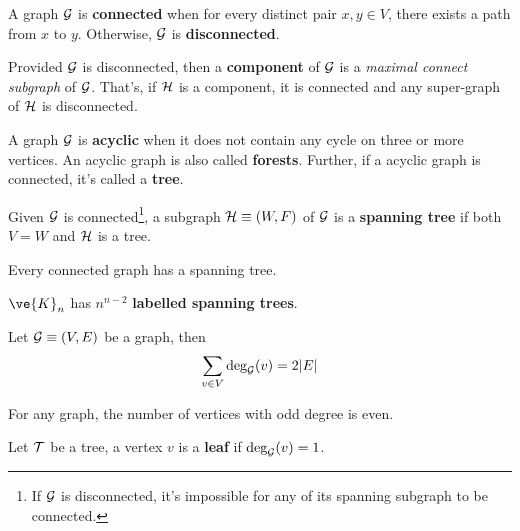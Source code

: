 \documentclass{article}
\begin{document}
		\begin{definition}
			A graph $\mathcal{{G}}$ is \textbf{connected} when for every distinct pair $x, y \in V$, there exists a path from $x$ to $y$. Otherwise, $\mathcal{{G}}$ is \textbf{disconnected}.
		\end{definition}
		
		\begin{definition}
			Provided $\mathcal{{G}}$ is disconnected, then a \textbf{component} of $\mathcal{{G}}$ is a \emph{maximal connect subgraph} of $\mathcal{{G}}$. That's, if $\mathcal{{H}}$ is a component, it is connected and any super-graph of $\mathcal{{H}}$ is disconnected.
		\end{definition}
		
		\begin{definition}
			A graph $\mathcal{{G}}$ is \textbf{acyclic} when it does not contain any cycle on three or more vertices. An acyclic graph is also called \textbf{forests}. Further, if a acyclic graph is connected, it's called a \textbf{tree}.
		\end{definition}
		
		\begin{definition}
			Given $\mathcal{{G}}$ is connected\footnote{If $\mathcal{{G}}$ is disconnected, it's impossible for any of its spanning subgraph to be connected.}, a subgraph $\mathcal{{H}} \equiv (W, F)$ of $\mathcal{{G}}$ is a \textbf{spanning tree} if both $V = W$ and $\mathcal{{H}}$ is a tree.
		\end{definition}
		
		\begin{proposition}
			Every connected graph has a spanning tree.
		\end{proposition}
		
		\begin{theorem}
			$\ve{K}_n$ has $n^{n-2}$ \textbf{labelled spanning trees}.
		\end{theorem}
		
		\begin{theorem}
			Let $\mathcal{{G}} \equiv (V, E)$ be a graph, then
			\begin{equation}
				\sum_{v \in V}\text{{deg}}_{\mathcal{{G}}}(v) = 2 |E|
			\end{equation}
		\end{theorem}
		
		\begin{corollary}
			For any graph, the number of vertices with odd degree is even.
		\end{corollary}
		
		\begin{definition}
			Let $\mathcal{{T}}$ be a tree, a vertex $v$ is a \textbf{leaf} if $\text{{deg}}_{\mathcal{{G}}}(v)=1$.
		\end{definition}
		
\end{document}
